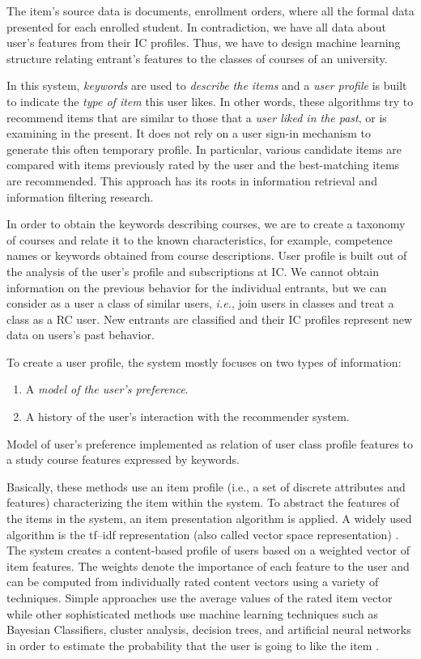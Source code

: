 \documentclass[conference]{IEEEtran}
\begin{document}
The item's source data is documents, enrollment orders, where all the formal data presented for each enrolled student.  In contradiction, we have all data about user's features from their IC profiles.  Thus, we have to design machine learning structure relating entrant's features to the classes of courses of an university.

{\footnotesize
In this system, \emph{keywords} are used to \emph{describe the items} and a \emph{user profile} is built to indicate the \emph{type of item} this user likes. In other words, these algorithms try to recommend items that are similar to those that a \emph{user liked in the past}, or is examining in the present. It does not rely on a user sign-in mechanism to generate this often temporary profile. In particular, various candidate items are compared with items previously rated by the user and the best-matching items are recommended. This approach has its roots in information retrieval and information filtering research.
}

In order to obtain the keywords describing courses, we are to create a taxonomy of courses and relate it to the known characteristics, for example, competence names or keywords obtained from course descriptions.  User profile is built out of the analysis of the user's profile and subscriptions at IC.  We cannot obtain information on the previous behavior for the individual entrants, but we can consider as a user a class of similar users, \emph{i.e.}, join users in classes and treat a class as a RC user.  New entrants are classified and their IC profiles represent new data on users's past behavior.

{\footnotesize
To create a user profile, the system mostly focuses on two types of information:
\begin{enumerate}
\item A \emph{model of the user's preference}.
\item A history of the user's interaction with the recommender system.
\end{enumerate}
}

Model of user's preference implemented as relation of user class profile features to a study course features expressed by keywords.

{\footnotesize
Basically, these methods use an item profile (i.e., a set of discrete attributes and features) characterizing the item within the system. To abstract the features of the items in the system, an item presentation algorithm is applied. A widely used algorithm is the tf–idf representation (also called vector space representation) \cite{wb43}. The system creates a content-based profile of users based on a weighted vector of item features. The weights denote the importance of each feature to the user and can be computed from individually rated content vectors using a variety of techniques. Simple approaches use the average values of the rated item vector while other sophisticated methods use machine learning techniques such as Bayesian Classifiers, cluster analysis, decision trees, and artificial neural networks in order to estimate the probability that the user is going to like the item \cite{wb44}.
}
\end{document}
